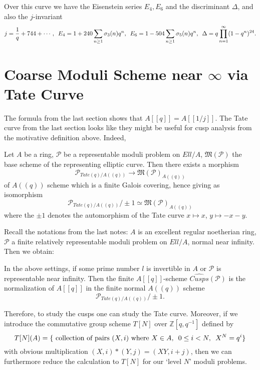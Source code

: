 \documentclass[a4paper,11pt]{article}
\begin{document}
Over this curve we have the Eisenstein series $E_4,E_6$ and the discriminant $\Delta$, and also the $j$-invariant
\[
j=\frac{1}{q}+744+\cdots, \enskip E_4=1+240\sum_{n\geq1}\sigma_3(n)q^n, \enskip E_6=1-504\sum_{n\geq1}\sigma_5(n)q^n, \enskip \Delta=q\prod_{n=1}^{\infty}(1-q^n)^{24}.
\]




\section{Coarse Moduli Scheme near $\infty$ via Tate Curve}


The formula from the last section shows that $A[[q]]=A[[1/j]]$.
The Tate curve from the last section looks like they might be useful for cusp analysis from the motivative definition above.
Indeed,

\begin{prp}
Let $A$ be a ring, $\mathcal{P}$ be a representable moduli problem on $Ell/A$, $\mathfrak{M}(\mathcal{P})$ the base scheme of the representing elliptic curve.
Then there exists a morphism
\[
\mathcal{P}_{Tate(q)/A((q))} \to \mathfrak{M}(\mathcal{P})_{A((q))}
\]
of $A((q))$ scheme which is a finite Galois covering, hence giving as isomorphism
\[
\mathcal{P}_{Tate(q)/A((q))}/\pm1 \simeq \mathfrak{M}(\mathcal{P})_{A((q))}
\]
where the $\pm1$ denotes the automorphism of the Tate curve $x \mapsto x$, $y \mapsto -x-y$.
\end{prp}

Recall the notations from the last notes:
$A$ is an excellent regular noetherian ring, $\mathcal{P}$ a finite relatively representable moduli problem on $Ell/A$, normal near infinity.
Then we obtain:

\begin{thm}
In the above settings, if some prime number $l$ is invertible in $A$ or $\mathcal{P}$ is representable near infinity.
Then the finite $A[[q]]$-scheme $\widehat{Cusps}(\mathcal{P})$ is the normalization of $A[[q]]$ in the finite normal $A((q))$ scheme
\[
\mathcal{P}_{Tate(q)/A((q))}/\pm1.
\]

\end{thm}

Therefore, to study the cusps one can study the Tate curve.
Moreover, if we introduce the commutative group scheme $T[N]$ over $\mathbb{Z}[q,q^{-1}]$ defined by
\[
T[N](A) =\{\textnormal{ collection of pairs }(X,i) \textnormal{ where }X\in A, \enskip 0 \leq i <N, \enskip X^N=q^i\} 
\]
with obvious multiplication $(X,i)*(Y,j)=(XY,i+j)$, then we can furthermore reduce the calculation to $T[N]$ for our `level $N$' moduli problems.
\end{document}
